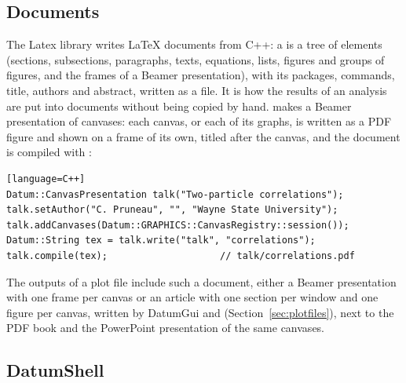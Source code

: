 \subsection{Documents}
\label{sec:latex}

The Latex library writes \LaTeX{} documents from C++: a  is a tree of elements (sections,
subsections, paragraphs, texts, equations, lists, figures and groups of figures, and the frames of a Beamer
presentation), with its packages, commands, title, authors and abstract, written as a  file. It is how
the results of an analysis are put into documents without being copied by hand.  makes a
Beamer presentation of canvases: each canvas, or each of its graphs, is written as a PDF figure and shown on a frame
of its own, titled after the canvas, and the document is compiled with :
\begin{widetext}
\begin{verbatim}[language=C++]
Datum::CanvasPresentation talk("Two-particle correlations");
talk.setAuthor("C. Pruneau", "", "Wayne State University");
talk.addCanvases(Datum::GRAPHICS::CanvasRegistry::session());
Datum::String tex = talk.write("talk", "correlations");
talk.compile(tex);                    // talk/correlations.pdf
\end{verbatim}
\end{widetext}
The outputs of a plot file include such a document, either a Beamer presentation with one frame per canvas or an
article with one section per window and one figure per canvas, written by DatumGui and 
(Section~\ref{sec:plotfiles}), next to the PDF book and the PowerPoint presentation of the same canvases.

\subsection{DatumShell}
\label{sec:capshell}

